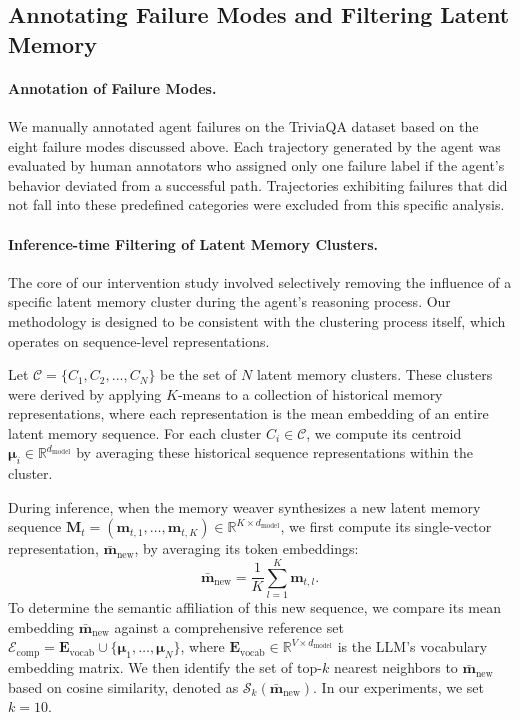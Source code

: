 \documentclass[]{fairmeta}
\begin{document}
\subsection{Annotating Failure Modes and Filtering Latent Memory}
\label{app:failure-annotation}
\paragraph{Annotation of Failure Modes.}
We manually annotated agent failures on the TriviaQA dataset based on the eight failure modes discussed above.  Each trajectory generated by the agent was evaluated by human annotators who assigned only one failure label if the agent's behavior deviated from a successful path. Trajectories exhibiting failures that did not fall into these predefined categories were excluded from this specific analysis.


\paragraph{Inference-time Filtering of Latent Memory Clusters.}
The core of our intervention study involved selectively removing the influence of a specific latent memory cluster during the agent's reasoning process. Our methodology is designed to be consistent with the clustering process itself, which operates on sequence-level representations.

Let $\mathcal{C} = \{C_1, C_2, \ldots, C_N\}$ be the set of $N$ latent memory clusters. These clusters were derived by applying $K$-means to a collection of historical memory representations, where each representation is the mean embedding of an entire latent memory sequence. For each cluster $C_i \in \mathcal{C}$, we compute its centroid $\mathbf{\mu}_i \in \mathbb{R}^{d_\text{model}}$ by averaging these historical sequence representations within the cluster.

During inference, when the memory weaver synthesizes a new latent memory sequence $\mathbf{M}_t = (\mathbf{m}_{t,1}, \ldots, \mathbf{m}_{t,K}) \in \mathbb{R}^{K \times d_\text{model}}$, we first compute its single-vector representation, $\bar{\mathbf{m}}_\text{new}$, by averaging its token embeddings:
\begin{equation}
\bar{\mathbf{m}}_\text{new} = \frac{1}{K} \sum_{l=1}^{K} \mathbf{m}_{t,l}.
\end{equation}
To determine the semantic affiliation of this new sequence, we compare its mean embedding $\bar{\mathbf{m}}_\text{new}$ against a comprehensive reference set $\mathcal{E}_\text{comp} = \mathbf{E}_\text{vocab} \cup \{\mathbf{\mu}_1, \ldots, \mathbf{\mu}_N\}$, where $\mathbf{E}_\text{vocab} \in \mathbb{R}^{V \times d_\text{model}}$ is the LLM's vocabulary embedding matrix. We then identify the set of top-$k$ nearest neighbors to $\bar{\mathbf{m}}_\text{new}$ based on cosine similarity, denoted as $\mathcal{S}_k(\bar{\mathbf{m}}_\text{new})$. In our experiments, we set $k=10$.
\end{document}
